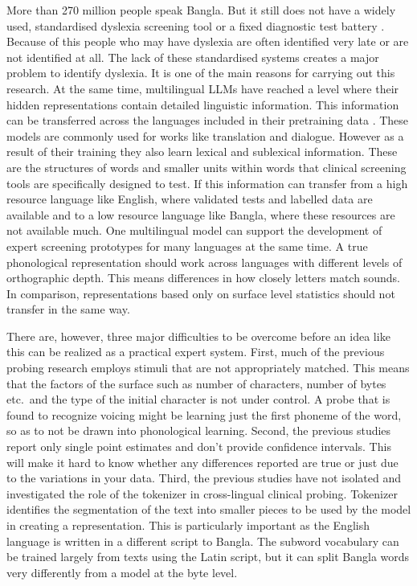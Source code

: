 \documentclass[preprint,12pt,authoryear]{elsarticle}
\begin{document}
More than 270 million people speak Bangla. But it still does not have a widely used, standardised dyslexia screening tool or a fixed diagnostic test battery \citep{nag2014dyslexia,nag2017indian,badsha2024mall}. Because of this people who may have dyslexia are often identified very late or are not identified at all. The lack of these standardised systems creates a major problem to identify dyslexia. It is one of the main reasons for carrying out this research.
At the same time, multilingual LLMs have reached a level where their hidden representations contain detailed linguistic information. This information can be transferred across the languages included in their pretraining data \citep{conneau2020xlmr,scao2022bloom,xue2021mt5}. These models are commonly used for works like translation and dialogue. However as a result of their training they also learn lexical and sublexical information. These are the structures of words and smaller units within words that clinical screening tools are specifically designed to test.
If this information can transfer from a high resource language like English, where validated tests and labelled data are available and to a low resource language like Bangla, where these resources are not available much. One multilingual model can support the development of expert screening prototypes for many languages at the same time. A true phonological representation should work across languages with different levels of orthographic depth. This means differences in how closely letters match sounds. In comparison, representations based only on surface level statistics should not transfer in the same way.

There are, however, three major difficulties to be overcome before an idea like this can be realized as a practical expert system. First, much of the previous probing research employs stimuli that are not appropriately matched. This means that the factors of the surface such as number of characters, number of bytes etc.\ and the type of the initial character is not under control. A probe that is found to recognize voicing might be learning just the first phoneme of the word, so as to not be drawn into phonological learning.
Second, the previous studies report only single point estimates and don't provide confidence intervals. This will make it hard to know whether any differences reported are true or just due to the variations in your data.
Third, the previous studies have not isolated and investigated the role of the tokenizer in cross-lingual clinical probing. Tokenizer identifies the segmentation of the text into smaller pieces to be used by the model in creating a representation. This is particularly important as the English language is written in a different script to Bangla. The subword vocabulary can be trained largely from texts using the Latin script, but it can split Bangla words very differently from a model at the byte level.
\end{document}
